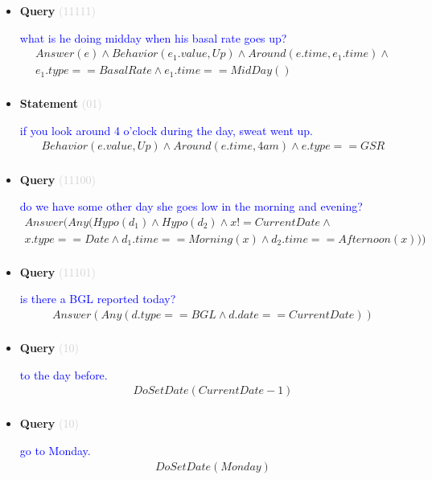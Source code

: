 \documentclass[11pt]{article}
\newcommand{\key}[1]{\textcolor{lightgray}{#1}}
\newcounter{CQuery}
\newcounter{CStatement}
\begin{document}
\begin{itemize}
\item
\textbf{Query\theCQuery} \key{(11111)} \addtocounter{CQuery}{1}
\textcolor{blue}{ what is he doing midday when his basal rate goes up? }
\begin{multline*}
Answer(e) \wedge Behavior(e_1.value, Up) \wedge Around(e.time, e_1.time) \wedge \\ 
e_1.type==BasalRate \wedge e_1.time==MidDay() \\ 
\end{multline*}


\item
\textbf{Statement\theCStatement} \key{(01)} \addtocounter{CStatement}{1}
\textcolor{blue}{ if you look around 4 o'clock during the day, sweat went up. }
\begin{multline*}
Behavior(e.value, Up) \wedge Around(e.time, 4am) \wedge e.type==GSR \\ 
\end{multline*}


\item
\textbf{Query\theCQuery} \key{(11100)} \addtocounter{CQuery}{1}
\textcolor{blue}{ do we have some other day she goes low in the morning and evening? }
\begin{multline*}
Answer(Any(Hypo(d_1) \wedge Hypo(d_2) \wedge x != CurrentDate \wedge \\ 
x.type==Date \wedge d_1.time==Morning(x) \wedge d_2.time==Afternoon(x))) \\ 
\end{multline*}


\item
\textbf{Query\theCQuery} \key{(11101)} \addtocounter{CQuery}{1}
\textcolor{blue}{ is there a BGL reported today? }
\begin{multline*}
Answer(Any(d.type==BGL \wedge d.date==CurrentDate)) \\ 
\end{multline*}


\item
\textbf{Query\theCQuery} \key{(10)} \addtocounter{CQuery}{1}
\textcolor{blue}{ to the day before. }
\begin{multline*}
DoSetDate(CurrentDate - 1) \\ 
\end{multline*}


\item
\textbf{Query\theCQuery} \key{(10)} \addtocounter{CQuery}{1}
\textcolor{blue}{ go to Monday. }
\begin{multline*}
DoSetDate(Monday) \\ 
\end{multline*}



\end{itemize}
\end{document}
